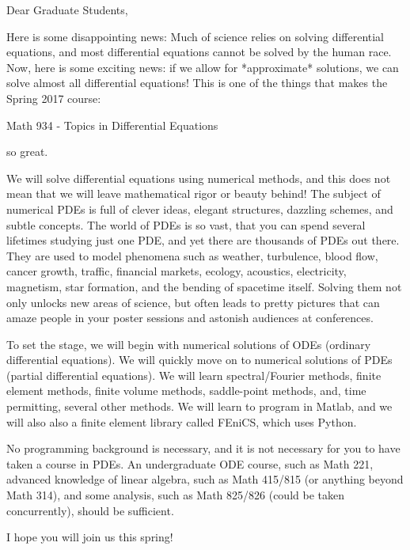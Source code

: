 \documentclass[]{article}
\date{10/14/16}
\begin{document}
Dear Graduate Students,

Here is some disappointing news: Much of science relies on solving differential equations, and most differential equations cannot be solved by the human race.  Now, here is some exciting news: if we allow for *approximate* solutions, we can solve almost all differential equations!  This is one of the things that makes the Spring 2017 course:

  Math 934 - Topics in Differential Equations

so great.

We will solve differential equations using numerical methods, and this does not mean that we will leave mathematical rigor or beauty behind!  The subject of numerical PDEs is full of clever ideas, elegant structures, dazzling schemes, and subtle concepts.  The world of PDEs is so vast, that you can spend several lifetimes studying just one PDE, and yet there are thousands of PDEs out there.  They are used to model phenomena such as weather, turbulence, blood flow, cancer growth, traffic, financial markets, ecology, acoustics, electricity, magnetism, star formation, and the bending of spacetime itself.  Solving them not only unlocks new areas of science, but often leads to pretty pictures that can amaze people in your poster sessions and astonish audiences at conferences.

To set the stage, we will begin with numerical solutions of ODEs (ordinary differential equations).  We will quickly move on to numerical solutions of PDEs (partial differential equations).  We will learn spectral/Fourier methods, finite element methods, finite volume methods, saddle-point methods, and, time permitting, several other methods.  We will learn to program in Matlab, and we will also also a finite element library called FEniCS, which uses Python.

No programming background is necessary, and it is not necessary for you to have taken a course in PDEs.  An undergraduate ODE course, such as Math 221, advanced knowledge of linear algebra, such as Math 415/815 (or anything beyond Math 314), and some analysis, such as Math 825/826 (could be taken concurrently), should be sufficient.

I hope you will join us this spring!
\end{document}
